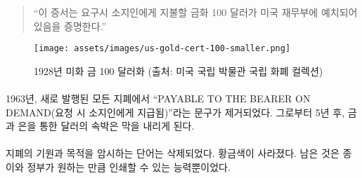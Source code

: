 \begin{comment}
	\begin{quotation}\begin{samepage}
			\enquote{This certifies that there have been deposited in the treasury of the
				United States of America one hundred dollars in gold coin payable to
				the bearer on demand.}
	\end{samepage}\end{quotation}
\end{comment}
\begin{quotation}\begin{samepage}
		\enquote{이 증서는 요구시 소지인에게 지불할 금화 100 달러가 미국 재무부에 예치되어 있음을 증명한다.}
\end{samepage}\end{quotation}

\begin{comment}
	\begin{figure}
		\centering
		\texttt{[image: assets/images/us-gold-cert-100-smaller.png]}
		\caption{A 1928 U.S. \$100 gold certificate. Picture cc-by-sa National Numismatic Collection, National Museum of American History.}
		\label{fig:us-gold-cert-100-smaller}
	\end{figure}
\end{comment}
\begin{figure}
	\centering
	\texttt{[image: assets/images/us-gold-cert-100-smaller.png]}
	\caption{1928년 미화 금 100 달러화 (출처: 미국 국립 박물관 국립 화폐 컬렉션)}
	\label{fig:us-gold-cert-100-smaller}
\end{figure}

\paragraph{}
\begin{comment}
	In 1963, the words \enquote{PAYABLE TO THE BEARER ON DEMAND} were removed from
	all newly issued notes. Five years later, the redemption of paper notes
	for gold and silver ended.
\end{comment}
1963년, 새로 발행된 모든 지폐에서 \enquote{PAYABLE TO THE BEARER ON DEMAND(요청 시 소지인에게 지급됨)}라는 문구가 제거되었다. 
그로부터 5년 후, 금과 은을 통한 달러의 속박은 막을 내리게 된다.

\paragraph{}
\begin{comment}
	The words hinting on the origins and the idea behind paper money were
	removed. The golden color disappeared. All that was left was the paper
	and with it the ability of the government to print as much of it as it
	wishes.
\end{comment}
지폐의 기원과 목적을 암시하는 단어는 삭제되었다. 황금색이 사라졌다. 
남은 것은 종이와 정부가 원하는 만큼 인쇄할 수 있는 능력뿐이었다.

